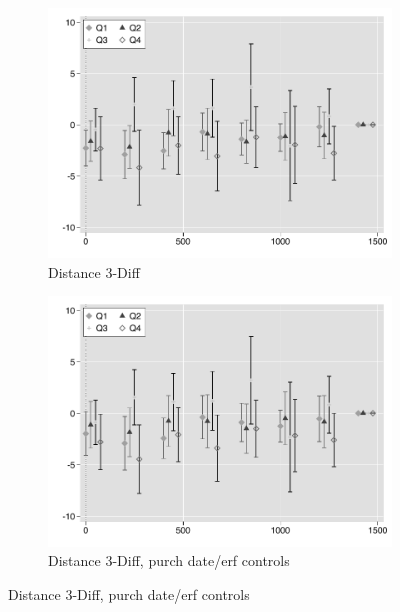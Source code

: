 \documentclass[12pt]{article}
\begin{document}
\begin{figure}
       \centering
   \caption[ Transaction frequency over distance ]
    {\small Transaction frequency over distance} 
        \begin{subfigure}[b]{0.48\textwidth}
                    \caption[Network2]%
            {{\footnotesize Distance 3-Diff}}    
            \label{fig:prefor}
            \centering
            \includegraphics[width=\textwidth,trim={0.3cm .3cm 0.1cm 0cm}, clip=true]{figures/freq_dist_3d_no_ctrl_q}
        \end{subfigure}
        \hfill
        \begin{subfigure}[b]{0.48\textwidth}
                    \caption[Network2]%
            {{\footnotesize Distance 3-Diff, purch date/erf controls}}    
            \label{fig:prefor}
            \centering
            \includegraphics[width=\textwidth,trim={0.3cm .3cm 0.1cm 0cm}, clip=true]{figures/freq_dist_3d_ctrl_q}

\end{subfigure}
\end{figure}
\end{document}
